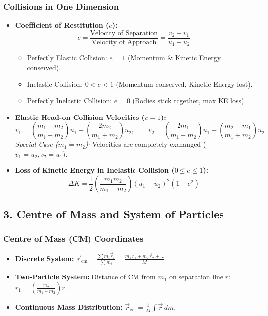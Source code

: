 \documentclass[11pt,a4paper]{article}
\begin{document}
\subsubsection{Collisions in One Dimension}
\begin{itemize}[leftmargin=1.5em, itemsep=2pt]
  \item \textbf{Coefficient of Restitution ($e$):}
  \[
    e = \frac{\text{Velocity of Separation}}{\text{Velocity of Approach}} = \frac{v_2 - v_1}{u_1 - u_2}
  \]
  \begin{itemize}[label=$\circ$]
    \item Perfectly Elastic Collision: $e = 1$ (Momentum \& Kinetic Energy conserved).
    \item Inelastic Collision: $0 < e < 1$ (Momentum conserved, Kinetic Energy lost).
    \item Perfectly Inelastic Collision: $e = 0$ (Bodies stick together, max KE loss).
  \end{itemize}
  \item \textbf{Elastic Head-on Collision Velocities ($e = 1$):}
  \[
    v_1 = \left(\frac{m_1 - m_2}{m_1 + m_2}\right)u_1 + \left(\frac{2 m_2}{m_1 + m_2}\right)u_2, \qquad v_2 = \left(\frac{2 m_1}{m_1 + m_2}\right)u_1 + \left(\frac{m_2 - m_1}{m_1 + m_2}\right)u_2
  \]
  \textit{Special Case ($m_1 = m_2$):} Velocities are completely exchanged ($v_1 = u_2, v_2 = u_1$).
  \item \textbf{Loss of Kinetic Energy in Inelastic Collision ($0 \le e \le 1$):}
  \[
    \Delta K = \frac{1}{2} \left(\frac{m_1 m_2}{m_1 + m_2}\right) (u_1 - u_2)^2 (1 - e^2)
  \]
\end{itemize}

\subsection{3. Centre of Mass and System of Particles}

\subsubsection{Centre of Mass (CM) Coordinates}
\begin{itemize}[leftmargin=1.5em, itemsep=2pt]
  \item \textbf{Discrete System:} $\vec{r}_{\text{cm}} = \frac{\sum m_i \vec{r}_i}{\sum m_i} = \frac{m_1\vec{r}_1 + m_2\vec{r}_2 + \dots}{M}$.
  \item \textbf{Two-Particle System:} Distance of CM from $m_1$ on separation line $r$: $r_1 = \left(\frac{m_2}{m_1 + m_2}\right) r$.
  \item \textbf{Continuous Mass Distribution:} $\vec{r}_{\text{cm}} = \frac{1}{M} \int \vec{r} \, dm$.
\end{itemize}
\end{document}
